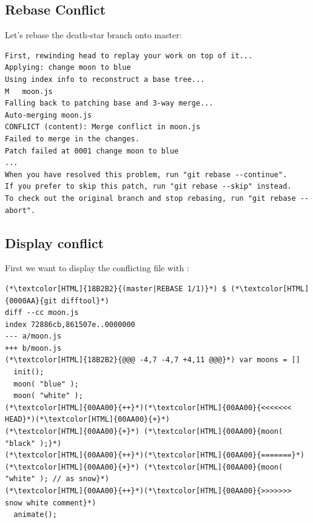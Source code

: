 \subsection{Rebase Conflict}
\begin{frame}[fragile]
  \subslidetitle
  Let's rebase the death-star branch onto master:
  \begin{lstlisting}
First, rewinding head to replay your work on top of it...
Applying: change moon to blue
Using index info to reconstruct a base tree...
M	moon.js
Falling back to patching base and 3-way merge...
Auto-merging moon.js
CONFLICT (content): Merge conflict in moon.js
Failed to merge in the changes.
Patch failed at 0001 change moon to blue
...
When you have resolved this problem, run "git rebase --continue".
If you prefer to skip this patch, run "git rebase --skip" instead.
To check out the original branch and stop rebasing, run "git rebase --abort".
\end{lstlisting}
\end{frame}

\subsection{Display conflict}
\begin{frame}[fragile]
  \subslidetitle
  First we want to display the conflicting file with :
  \begin{lstlisting}
(*\textcolor[HTML]{18B2B2}{(master|REBASE 1/1)}*) $ (*\textcolor[HTML]{0000AA}{git difftool}*)
diff --cc moon.js
index 72886cb,861507e..0000000
--- a/moon.js
+++ b/moon.js
(*\textcolor[HTML]{18B2B2}{@@@ -4,7 -4,7 +4,11 @@@}*) var moons = []
  init();
  moon( "blue" );
  moon( "white" );
(*\textcolor[HTML]{00AA00}{++}*)(*\textcolor[HTML]{00AA00}{<<<<<<< HEAD}*)(*\textcolor[HTML]{00AA00}{+}*)
(*\textcolor[HTML]{00AA00}{+}*) (*\textcolor[HTML]{00AA00}{moon( "black" );}*)
(*\textcolor[HTML]{00AA00}{++}*)(*\textcolor[HTML]{00AA00}{=======}*)
(*\textcolor[HTML]{00AA00}{+}*) (*\textcolor[HTML]{00AA00}{moon( "white" ); // as snow}*)
(*\textcolor[HTML]{00AA00}{++}*)(*\textcolor[HTML]{00AA00}{>>>>>>> snow white comment}*)
  animate();
\end{lstlisting}
\end{frame}

